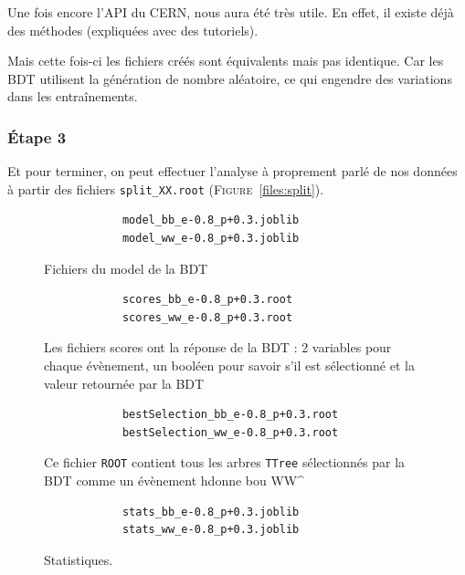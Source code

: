 \documentclass[10pt,a4paper]{report}
\newcommand{\ROOT}{\texttt{ROOT}\xspace}
\newcommand{\bbar}{\overline{b}}
\newcommand{\Wstar}{W^{\star}}
\newcommand{\nnh}{\nu \nu h}
\begin{document}
Une fois encore l'API du CERN, nous aura été très utile. En effet, il existe déjà des méthodes (expliquées avec des tutoriels). 

Mais cette fois-ci les fichiers créés sont équivalents mais pas identique. Car les BDT utilisent la génération de nombre aléatoire, ce qui engendre des variations dans les entraînements.\\

\subsubsection{Étape 3}

Et pour terminer, on peut effectuer l'analyse à proprement parlé de nos données à partir des fichiers \texttt{split\_XX.root} (\textsc{Figure}~\ref{files:split}).

\begin{figure}[h!]
	\centering
	\begin{lstlisting}
			model_bb_e-0.8_p+0.3.joblib
			model_ww_e-0.8_p+0.3.joblib
	\end{lstlisting}
	\caption{Fichiers du model de la BDT}
	\label{files:model}
\end{figure}
	
\begin{figure}[h!]
	\centering
	\begin{lstlisting}
			scores_bb_e-0.8_p+0.3.root
			scores_ww_e-0.8_p+0.3.root
	\end{lstlisting}
	\caption{Les fichiers scores ont la réponse de la BDT : 2 variables pour chaque évènement, un booléen pour savoir s'il est sélectionné et la valeur retournée par la BDT}
	\label{files:scores}
\end{figure}
	
\begin{figure}[h!]
	\centering
	\begin{lstlisting}
			bestSelection_bb_e-0.8_p+0.3.root
			bestSelection_ww_e-0.8_p+0.3.root
	\end{lstlisting}
	\caption{Ce fichier \ROOT contient tous les arbres \texttt{TTree} sélectionnés par la BDT comme un évènement \nnh donne b\bbar ou W\Wstar}
	\label{files:bestSelection}
\end{figure}
	
\begin{figure}[h!]
	\centering
	\begin{lstlisting}
			stats_bb_e-0.8_p+0.3.joblib
			stats_ww_e-0.8_p+0.3.joblib
	\end{lstlisting}
	\caption{Statistiques.}
	\label{files:stats}
\end{figure}
\end{document}

